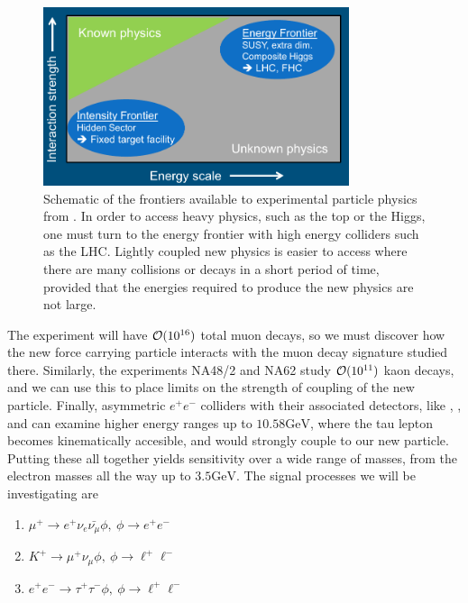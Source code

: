 \begin{figure}[h]
    \centering
    \includegraphics[width = 0.8\textwidth]{Figures/misc/frontiers}
    \caption{Schematic of the frontiers available to experimental particle physics from \cite{Alekhin:2015byh}. In order to access heavy physics, such as the top or the Higgs, one must turn to the energy frontier with high energy colliders such as the LHC. Lightly coupled new physics is easier to access where there are many collisions or decays in a short period of time, provided that the energies required to produce the new physics are not large.}
    \label{fig:frontiers}
\end{figure}

The experiment \mueee will have $\operatorname{\mathcal{O}}(10^{16})$ total muon decays, so we must discover how the new force carrying particle interacts with the muon decay signature studied there.
Similarly, the experiments NA48/2 and NA62 study $\operatorname{\mathcal{O}}(10^{11})$ kaon decays, and we can use this to place limits on the strength of coupling of the new particle.
Finally, asymmetric $e^+ e^-$ colliders with their associated detectors, like \babar, \belle, and \belletwo can examine higher energy ranges up to $10.58\textrm{GeV}$, where the tau lepton becomes kinematically accesible, and would strongly couple to our new particle.
Putting these all together yields sensitivity over a wide range of masses, from the electron masses all the way up to $3.5\textrm{GeV}$.
The signal processes we will be investigating are

\begin{enumerate}
\item $\mu^+ \rightarrow e^+ \nu_e \bar{\nu_\mu} \phi,~\phi \rightarrow e^+ e^-$
\item $K^+ \rightarrow \mu^+ \nu_\mu \phi,~\phi \rightarrow \ell^+ \ell^-$
\item $e^+ e^- \rightarrow \tau^+ \tau^- \phi,~\phi \rightarrow \ell^+ \ell^-$
\end{enumerate}

